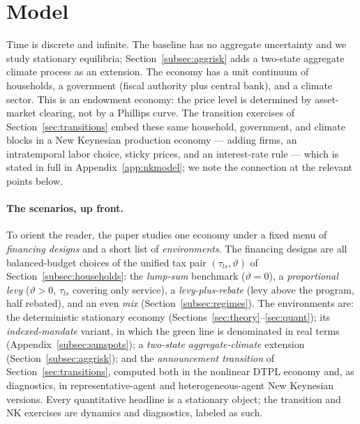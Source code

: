 \documentclass[12pt]{article}
\begin{document}
\section{Model}\label{sec:model}

Time is discrete and infinite. The baseline has no aggregate uncertainty
and we study stationary equilibria; Section~\ref{subsec:aggrisk} adds a
two-state aggregate climate process as an extension. The economy has a
unit continuum of households, a government (fiscal authority plus central
bank), and a climate sector. This is an endowment economy: the price
level is determined by asset-market clearing, not by a Phillips curve. The
transition exercises of Section~\ref{sec:transitions} embed these same
household, government, and climate blocks in a New Keynesian production
economy --- adding firms, an intratemporal labor choice, sticky prices, and
an interest-rate rule --- which is stated in full in
Appendix~\ref{app:nkmodel}; we note the connection at the relevant points
below.

\paragraph{The scenarios, up front.} To orient the reader, the paper studies
one economy under a fixed menu of \emph{financing designs} and a short list
of \emph{environments}. The financing designs are all balanced-budget
choices of the unified tax pair $(\tau_{ls},\vartheta)$ of
Section~\ref{subsec:households}: the \emph{lump-sum} benchmark ($\vartheta=0$),
a \emph{proportional levy} ($\vartheta>0$, $\tau_{ls}$ covering only service), a
\emph{levy-plus-rebate} (levy above the program, half rebated), and an even
\emph{mix} (Section~\ref{subsec:regimes}). The environments are: the
deterministic stationary economy (Sections~\ref{sec:theory}--\ref{sec:quant});
its \emph{indexed-mandate} variant, in which the green line is denominated in
real terms (Appendix~\ref{subsec:sunspots}); a \emph{two-state aggregate-climate}
extension (Section~\ref{subsec:aggrisk}); and the \emph{announcement transition}
of Section~\ref{sec:transitions}, computed both in the nonlinear DTPL economy
and, as diagnostics, in representative-agent and heterogeneous-agent New
Keynesian versions. Every quantitative headline is a stationary object; the
transition and NK exercises are dynamics and diagnostics, labeled as such.
\end{document}
